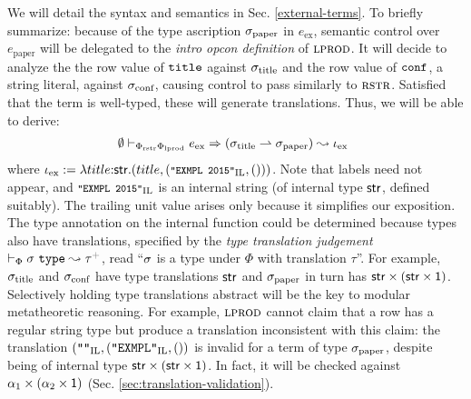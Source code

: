 \documentclass[pldi]{sigplanconf-pldi15}
\newcommand{\moutput}{^{\color{gray}+}}
\begin{document}
We will detail the syntax and semantics in Sec. \ref{external-terms}. To briefly summarize: because of the type ascription $\sigma_\text{paper}$ in $e_\text{ex}$, semantic control over $e_\text{paper}$ will be delegated to the \emph{intro opcon definition} of $\textsc{lprod}$. It will decide to analyze the the row value of $\texttt{title}$ against $\sigma_\text{title}$ and the row value of $\texttt{conf}$, a string literal, against $\sigma_\text{conf}$, causing control to pass similarly to $\textsc{rstr}$. Satisfied that the term is well-typed, these will generate translations. Thus, we will be able to derive:
\[\hspace{-5px}\begin{array}{l}\esyn{\emptyset}{\Phi_\text{rstr}\Phi_\text{lprod}}{e_\text{ex}}{(\stx{title}\rightharpoonup\stx{paper})}{\iota_\text{ex}}\end{array}\]
where $\small\iota_\text{ex} := \ilam{\keyw{str}}{title}{(title, (\texttt{"EXMPL 2015"}_\text{IL}, ()))}$. Note that labels need not appear, and $\small\texttt{"EXMPL 2015"}_\text{IL}$ is an internal string (of internal type ${\sf str}$, defined suitably). The trailing unit value arises only because it simplifies our exposition. The type annotation on the internal function could be determined because types also have translations, specified by the \emph{type translation judgement} $\vdash_\Phi \st~\mathtt{type} \leadsto \tau\moutput$, read ``$\sigma$ is a type under $\Phi$ with translation $\tau$''. For example, $\sigma_\text{title}$  and $\sigma_\text{conf}$ have type translations  ${\sf str}$ and  $\sigma_\text{paper}$ in turn has ${\sf str}\times({\sf str}\times{\sf 1})$. Selectively holding type translations abstract will be the key to modular metatheoretic reasoning. For example, $\textsc{lprod}$ cannot claim that a row has a regular string type but produce a translation inconsistent with this claim: the translation $(\texttt{""}_\text{IL}, (\texttt{"EXMPL"}_\text{IL}, ())$ is invalid for a term of type $\sigma_\text{paper}$, despite being of internal type ${\sf str}\times({\sf str}\times{\sf 1})$. In fact, it will be checked against $\alpha_1 \times (\alpha_2 \times {\sf 1})$ (Sec. \ref{sec:translation-validation}).

\end{document}
